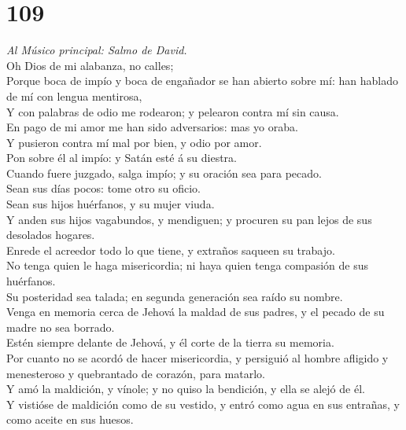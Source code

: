 \hypertarget{section-108}{%
\section{109}\label{section-108}}

 \emph{Al Músico principal: Salmo de David.}\\
Oh Dios de mi alabanza, no calles;\\
 Porque boca de impío y boca de engañador se han abierto
sobre mí: han hablado de mí con lengua mentirosa,\\
 Y con palabras de odio me rodearon; y pelearon contra mí
sin causa.\\
 En pago de mi amor me han sido adversarios: mas yo oraba.\\
 Y pusieron contra mí mal por bien, y odio por amor.\\
 Pon sobre él al impío: y Satán esté á su diestra.\\
 Cuando fuere juzgado, salga impío; y su oración sea para
pecado.\\
 Sean sus días pocos: tome otro su oficio.\\
 Sean sus hijos huérfanos, y su mujer viuda.\\
 Y anden sus hijos vagabundos, y mendiguen; y procuren su
pan lejos de sus desolados hogares.\\
 Enrede el acreedor todo lo que tiene, y extraños saqueen
su trabajo.\\
 No tenga quien le haga misericordia; ni haya quien tenga
compasión de sus huérfanos.\\
 Su posteridad sea talada; en segunda generación sea raído
su nombre.\\
 Venga en memoria cerca de Jehová la maldad de sus padres,
y el pecado de su madre no sea borrado.\\
 Estén siempre delante de Jehová, y él corte de la tierra
su memoria.\\
 Por cuanto no se acordó de hacer misericordia, y persiguió
al hombre afligido y menesteroso y quebrantado de corazón, para
matarlo.\\
 Y amó la maldición, y vínole; y no quiso la bendición, y
ella se alejó de él.\\
 Y vistióse de maldición como de su vestido, y entró como
agua en sus entrañas, y como aceite en sus huesos.\\
